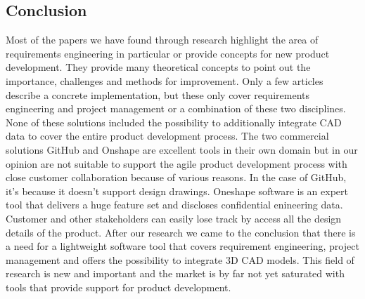     \subsection*{Conclusion}
    Most of the papers we have found through research highlight the area of requirements engineering in particular or provide concepts for new product development. They provide many theoretical concepts to point out the importance, challenges and methods for improvement. 
    Only a few articles describe a concrete implementation, but these only cover requirements engineering and project management or a combination of these two disciplines. None of these solutions included the possibility to additionally integrate CAD data to cover the entire product development process. The two commercial solutions GitHub and Onshape are excellent tools in their own domain but in our opinion are not suitable to support the agile product development process with close customer collaboration because of various reasons. 
    In the case of GitHub, it's because it doesn't support design drawings. 
    Oneshape software is an expert tool that delivers a huge feature set and discloses confidential enineering data. Customer and other stakeholders can easily lose track by access all the design details of the product. After our research we came to the conclusion that there is a need for a lightweight software tool that covers requirement engineering, project management and offers the possibility to integrate 3D CAD models. This field of research is new and important and the market is by far not yet saturated with tools that provide support for product development.

